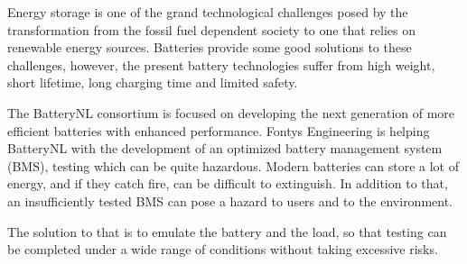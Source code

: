 
Energy storage is one of the grand technological challenges posed by the transformation from the fossil fuel dependent society to one that relies on renewable energy sources. Batteries provide some good solutions to these challenges, however, the present battery technologies suffer from high weight, short lifetime, long charging time and limited safety.

The BatteryNL consortium is focused on developing the next generation of more efficient batteries with enhanced performance. Fontys Engineering is helping BatteryNL with the development of an optimized battery management system (BMS), testing which can be quite hazardous. Modern batteries can store a lot of energy, and if they catch fire, can be difficult to extinguish. In addition to that, an insufficiently tested BMS can pose a hazard to users and to the environment. 

The solution to that is to emulate the battery and the load, so that testing can be completed under a wide range of conditions without taking excessive risks. 

